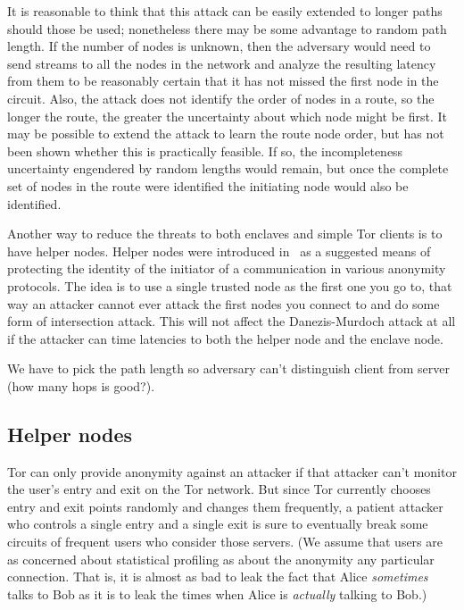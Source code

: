 \documentclass{llncs}
\begin{document}
It is reasonable to think that this attack can be easily extended to
longer paths should those be used; nonetheless there may be some
advantage to random path length. If the number of nodes is unknown,
then the adversary would need to send streams to all the nodes in the
network and analyze the resulting latency from them to be reasonably
certain that it has not missed the first node in the circuit. Also,
the attack does not identify the order of nodes in a route, so the
longer the route, the greater the uncertainty about which node might
be first. It may be possible to extend the attack to learn the route
node order, but has not been shown whether this is practically feasible.
If so, the incompleteness uncertainty engendered by random lengths would
remain, but once the complete set of nodes in the route were identified
the initiating node would also be identified.

Another way to reduce the threats to both enclaves and simple Tor
clients is to have helper nodes. Helper nodes were introduced
in~\cite{wright03} as a suggested means of protecting the identity
of the initiator of a communication in various anonymity protocols.
The idea is to use a single trusted node as the first one you go to,
that way an attacker cannot ever attack the first nodes you connect
to and do some form of intersection attack. This will not affect the
Danezis-Murdoch attack at all if the attacker can time latencies to
both the helper node and the enclave node.

We have to pick the path length so adversary can't distinguish client from
server (how many hops is good?).

\subsection{Helper nodes}
\label{subsec:helper-nodes}

Tor can only provide anonymity against an attacker if that attacker can't
monitor the user's entry and exit on the Tor network.  But since Tor
currently chooses entry and exit points randomly and changes them frequently,
a patient attacker who controls a single entry and a single exit is sure to
eventually break some circuits of frequent users who consider those servers.
(We assume that users are as concerned about statistical profiling as about
the anonymity any particular connection.  That is, it is almost as bad to
leak the fact that Alice {\it sometimes} talks to Bob as it is to leak the times
when Alice is {\it actually} talking to Bob.)
\end{document}

